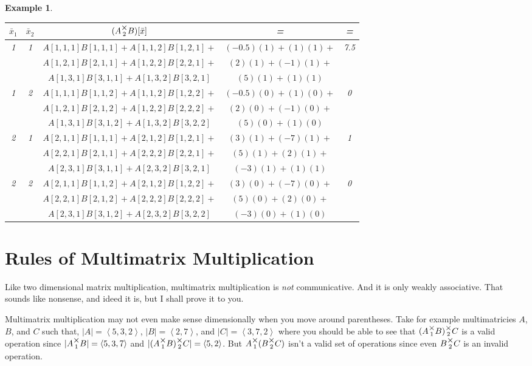 \documentclass[12pt]{book}
\theoremstyle{definition}
\theoremstyle{plain}
\newtheorem{example}{Example}[chapter]
\theoremstyle{ppart}
\theoremstyle{case}
\theoremstyle{solution}
\newcommand{\mmult}[1]{\text{\raisebox{1ex}{$\underset{#1}{\times}$}}}
\begin{document}
\begin{example}
\begin{table}[h!]
\begin{center}
\begin{tabular}{c c | c | c | c}
$\bar{x}_1$ & $\bar{x}_2$ & $(A \mmult{2} B)[\bar{x}]$ & = & = \\
\hline
1 & 1 &
  $A[1,1,1]B[1,1,1] + A[1,1,2]B[1,2,1] +$ & $(-0.5)(1) + (1)(1) +$ & 7.5 \\
&&$A[1,2,1]B[2,1,1] + A[1,2,2]B[2,2,1] +$ & $(2)(1) + (-1)(1) +$ & \\
&&$A[1,3,1]B[3,1,1] + A[1,3,2]B[3,2,1]$   & $(5)(1) + (1)(1)$ & \\
1 & 2 &
  $A[1,1,1]B[1,1,2] + A[1,1,2]B[1,2,2] +$ & $(-0.5)(0) + (1)(0) +$ & 0 \\
&&$A[1,2,1]B[2,1,2] + A[1,2,2]B[2,2,2] +$ & $(2)(0) + (-1)(0) +$ & \\
&&$A[1,3,1]B[3,1,2] + A[1,3,2]B[3,2,2]$   & $(5)(0) + (1)(0)$ & \\
2 & 1 &
  $A[2,1,1]B[1,1,1] + A[2,1,2]B[1,2,1] +$ & $(3)(1) + (-7)(1) +$ & 1 \\
&&$A[2,2,1]B[2,1,1] + A[2,2,2]B[2,2,1] +$ & $(5)(1) + (2)(1) +$ & \\
&&$A[2,3,1]B[3,1,1] + A[2,3,2]B[3,2,1]$   & $(-3)(1) + (1)(1)$ & \\
2 & 2 &
  $A[2,1,1]B[1,1,2] + A[2,1,2]B[1,2,2] +$ & $(3)(0) + (-7)(0) +$ & 0 \\
&&$A[2,2,1]B[2,1,2] + A[2,2,2]B[2,2,2] +$ & $(5)(0) + (2)(0) +$ & \\
&&$A[2,3,1]B[3,1,2] + A[2,3,2]B[3,2,2]$   & $(-3)(0) + (1)(0)$ &
\end{tabular}
\end{center}
\end{table}

\end{example}
\newpage

\section{Rules of Multimatrix Multiplication}

Like two dimensional matrix multiplication, multimatrix multiplication is
\textit{not} communicative. And it is only weakly associative. That sounds like
nonsense, and ideed it is, but I shall prove it to you.

Multimatrix multiplication may not even make sense dimensionally when you move
around parentheses. Take for example multimatricies $A$, $B$, and $C$ such that,
$|A| = \left<5,3,2\right>$,
$|B| = \left<2,7\right>$, and
$|C| = \left<3,7,2\right>$ where you should be able to see that
$(A \mmult{1} B) \mmult{2} C$ is a valid operation since
$|A \mmult{1} B| = \left<5,3,7\right>$ and
$|(A \mmult{1} B) \mmult{2} C| = \left<5,2\right>$. But
$A \mmult{1} (B \mmult{2} C)$ isn't a valid set of operations since even
$B \mmult{2} C$ is an invalid operation.
\end{document}
